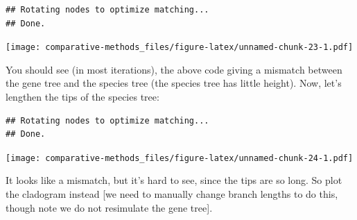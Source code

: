 \documentclass[
]{article}
\newenvironment{Shaded}{\begin{snugshade}}{\end{snugshade}}
\newcommand{\DecValTok}[1]{\textcolor[rgb]{0.00,0.00,0.81}{#1}}
\newcommand{\KeywordTok}[1]{\textcolor[rgb]{0.13,0.29,0.53}{\textbf{#1}}}
\newcommand{\NormalTok}[1]{#1}
\newcommand{\OperatorTok}[1]{\textcolor[rgb]{0.81,0.36,0.00}{\textbf{#1}}}
\newcommand{\StringTok}[1]{\textcolor[rgb]{0.31,0.60,0.02}{#1}}
\begin{document}
\begin{verbatim}
## Rotating nodes to optimize matching...
## Done.
\end{verbatim}

\texttt{[image: comparative-methods\_files/figure-latex/unnamed-chunk-23-1.pdf]}

You should see (in most iterations), the above code giving a mismatch between the gene tree and the species tree (the species tree has little height). Now, let's lengthen the tips of the species tree:

\begin{Shaded}
\end{Shaded}

\begin{verbatim}
## Rotating nodes to optimize matching...
## Done.
\end{verbatim}

\texttt{[image: comparative-methods\_files/figure-latex/unnamed-chunk-24-1.pdf]}

It looks like a mismatch, but it's hard to see, since the tips are so long. So plot the cladogram instead {[}we need to manually change branch lengths to do this, though note we do not resimulate the gene tree{]}.

\begin{Shaded}
\end{Shaded}
\end{document}
